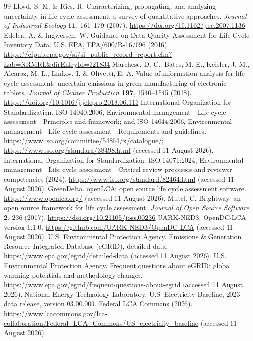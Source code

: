\documentclass[review,a4paper,fleqn]{cas-sc}
\begin{document}
\begin{thebibliography}{99}
 Lloyd, S. M. \& Ries, R. Characterizing, propagating, and analyzing uncertainty in life-cycle assessment: a survey of quantitative approaches. \textit{Journal of Industrial Ecology} \textbf{11}, 161--179 (2007). \url{https://doi.org/10.1162/jiec.2007.1136}
 Edelen, A. \& Ingwersen, W. Guidance on Data Quality Assessment for Life Cycle Inventory Data. U.S. EPA, EPA/600/R-16/096 (2016). \url{https://cfpub.epa.gov/si/si_public_record_report.cfm?Lab=NRMRL&dirEntryId=321834}
 Marchese, D. C., Bates, M. E., Keisler, J. M., Alcaraz, M. L., Linkov, I. \& Olivetti, E. A. Value of information analysis for life cycle assessment: uncertain emissions in green manufacturing of electronic tablets. \textit{Journal of Cleaner Production} \textbf{197}, 1540--1545 (2018). \url{https://doi.org/10.1016/j.jclepro.2018.06.113}
 International Organization for Standardization. ISO 14040:2006, Environmental management - Life cycle assessment - Principles and framework; and ISO 14044:2006, Environmental management - Life cycle assessment - Requirements and guidelines. \url{https://www.iso.org/committee/54854/x/catalogue/;} \url{https://www.iso.org/standard/38498.html} (accessed 11 August 2026).
 International Organization for Standardization. ISO 14071:2024, Environmental management - Life cycle assessment - Critical review processes and reviewer competencies (2024). \url{https://www.iso.org/standard/82464.html} (accessed 11 August 2026).
 GreenDelta. openLCA: open source life cycle assessment software. \url{https://www.openlca.org/} (accessed 11 August 2026).
 Mutel, C. Brightway: an open source framework for life cycle assessment. \textit{Journal of Open Source Software} \textbf{2}, 236 (2017). \url{https://doi.org/10.21105/joss.00236}
 UARK-NED3. OpenDC-LCA version 1.1.0. \url{https://github.com/UARK-NED3/OpenDC-LCA} (accessed 11 August 2026).
 U.S. Environmental Protection Agency. Emissions \& Generation Resource Integrated Database (eGRID), detailed data. \url{https://www.epa.gov/egrid/detailed-data} (accessed 11 August 2026).
 U.S. Environmental Protection Agency. Frequent questions about eGRID: global warming potentials and methodology changes. \url{https://www.epa.gov/egrid/frequent-questions-about-egrid} (accessed 11 August 2026).
 National Energy Technology Laboratory. U.S. Electricity Baseline, 2023 data release, version 03.00.000. Federal LCA Commons (2026). \url{https://www.lcacommons.gov/lca-collaboration/Federal_LCA_Commons/US_electricity_baseline} (accessed 11 August 2026).

\end{thebibliography}
\end{document}
